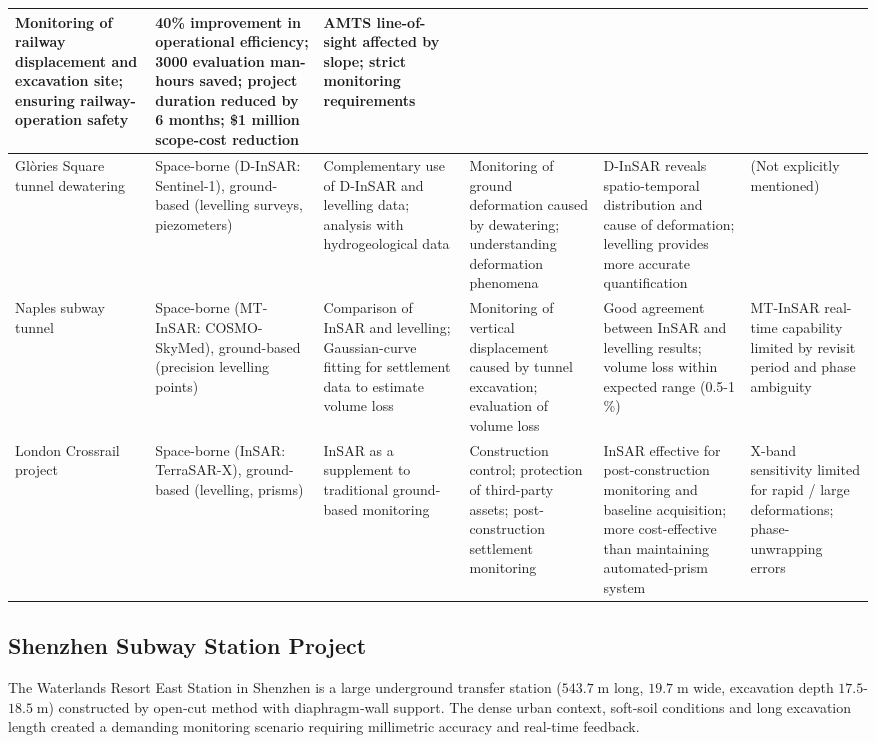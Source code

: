 \documentclass[preprint,11pt,authoryear,3p]{elsarticle}
\begin{document}
\begin{landscape}
\begin{table}[htbp]
\begin{tabular}{p{4cm}p{5cm}p{5.5cm}p{5cm}p{5cm}p{5cm}}
    Monitoring of railway displacement and excavation site; ensuring railway-operation safety &
    40\% improvement in operational efficiency; 3000 evaluation man-hours saved; project duration reduced by 6 months; \$1 million scope-cost reduction &
    AMTS line-of-sight affected by slope; strict monitoring requirements \\
    \midrule
    Glòries Square tunnel dewatering \citep{BOTEYIBASSOLS2021106041,SERRANOJUAN20171} &
    Space-borne (D-InSAR: Sentinel-1), ground-based (levelling surveys, piezometers) &
    Complementary use of D-InSAR and levelling data; analysis with hydrogeological data &
    Monitoring of ground deformation caused by dewatering; understanding deformation phenomena &
    D-InSAR reveals spatio-temporal distribution and cause of deformation; levelling provides more accurate quantification &
    (Not explicitly mentioned) \\
    \midrule
    Naples subway tunnel \citep{rs15102555} &
    Space-borne (MT-InSAR: COSMO-SkyMed), ground-based (precision levelling points) &
    Comparison of InSAR and levelling; Gaussian-curve fitting for settlement data to estimate volume loss &
    Monitoring of vertical displacement caused by tunnel excavation; evaluation of volume loss &
    Good agreement between InSAR and levelling results; volume loss within expected range (0.5-1 \%) &
    MT-InSAR real-time capability limited by revisit period and phase ambiguity \\
    \midrule
    London Crossrail project \citep{marti2017use} &
    Space-borne (InSAR: TerraSAR-X), ground-based (levelling, prisms) &
    InSAR as a supplement to traditional ground-based monitoring &
    Construction control; protection of third-party assets; post-construction settlement monitoring &
    InSAR effective for post-construction monitoring and baseline acquisition; more cost-effective than maintaining automated-prism system &
    X-band sensitivity limited for rapid / large deformations; phase-unwrapping errors \\
    \bottomrule
  \end{tabular}
\end{table}
\end{landscape}

\subsection{Shenzhen Subway Station Project}

The Waterlands Resort East Station in Shenzhen is a large underground transfer station ($543.7\;\mathrm{m}$ long, $19.7\;\mathrm{m}$ wide, excavation depth $17.5$-$18.5\;\mathrm{m}$) constructed by open‐cut method with diaphragm‐wall support. The dense urban context, soft-soil conditions and long excavation length created a demanding monitoring scenario requiring millimetric accuracy and real-time feedback.
\end{document}
